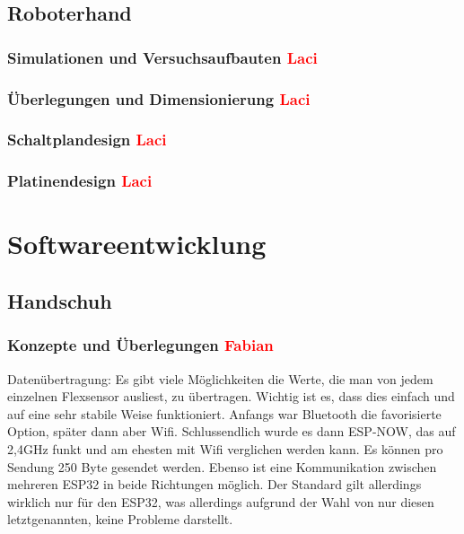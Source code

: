 \documentclass[11pt]{article}
\begin{document}
\subsection{Roboterhand}
\subsubsection{Simulationen und Versuchsaufbauten \textcolor{red}{Laci}}
\subsubsection{Überlegungen und Dimensionierung \textcolor{red}{Laci}}
\subsubsection{Schaltplandesign \textcolor{red}{Laci}}
\subsubsection{Platinendesign \textcolor{red}{Laci}}


\section{Softwareentwicklung}

\subsection{Handschuh}
\subsubsection{Konzepte und Überlegungen \textcolor{red}{Fabian}}
Datenübertragung:
Es gibt viele Möglichkeiten die Werte, die man von jedem einzelnen Flexsensor ausliest, zu übertragen. Wichtig ist es, dass 
dies einfach und auf eine sehr stabile Weise funktioniert. Anfangs war Bluetooth die favorisierte Option, später dann aber Wifi. 
Schlussendlich wurde es dann ESP-NOW, das auf 2,4GHz funkt und am ehesten mit Wifi verglichen werden kann. Es können pro 
Sendung 250 Byte gesendet werden. Ebenso ist eine Kommunikation zwischen mehreren ESP32 in beide Richtungen möglich. Der 
Standard gilt allerdings wirklich nur für den ESP32, was allerdings aufgrund der Wahl von nur diesen letztgenannten, keine 
Probleme darstellt.
\end{document}
